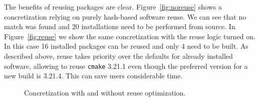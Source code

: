 %
%
The benefits of reusing packages are clear. Figure~\ref{fig:noreuse} shows a
concretization relying on purely hash-based software reuse. We can see that no match was
found and 20 installations need to be performed from source. In Figure~\ref{fig:reuse}
we show the same concretization with the reuse logic turned on. In this case 16
installed packages can be reused and only 4 need to be built. As described above, reuse
takes priority over the defaults for already installed software, allowing \spack{} to
reuse \texttt{cmake} 3.21.1 even though the preferred version for a new build is 3.21.4.
This can save users considerable time.

\begin{figure}[ht]
  \centering
  \caption{Concretization with and without reuse optimization. \vspace{-1em}}

\end{figure}


